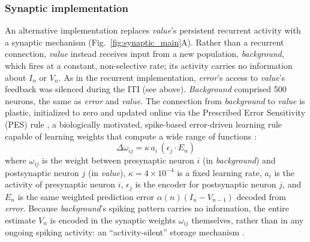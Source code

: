 \documentclass[12pt]{article}
\begin{document}
\subsubsection*{Synaptic implementation}
An alternative implementation replaces \textit{value}'s persistent recurrent activity with a synaptic mechanism (Fig.~\ref{fig:synaptic_main}A). Rather than a recurrent connection, \textit{value} instead receives input from a new population, \textit{background}, which fires at a constant, non-selective rate; its activity carries no information about $I_n$ or $V_n$. As in the recurrent implementation, \textit{error}'s access to \textit{value}'s feedback was silenced during the ITI (see above). \textit{Background} comprised 500 neurons, the same as \textit{error} and \textit{value}. The connection from \textit{background} to \textit{value} is plastic, initialized to zero and updated online via the Prescribed Error Sensitivity (PES) rule \cite{macneil2011fine}, a biologically motivated, spike-based error-driven learning rule capable of learning weights that compute a wide range of functions \cite{voelker2015solution}:
\begin{equation}
    \label{eq:pes}
    \Delta\omega_{ij} = \kappa\, a_i\, (\epsilon_j \cdot E_n)
\end{equation}
where $\omega_{ij}$ is the weight between presynaptic neuron $i$ (in \textit{background}) and postsynaptic neuron $j$ (in \textit{value}), $\kappa=4\times10^{-4}$ is a fixed learning rate, $a_i$ is the activity of presynaptic neuron $i$, $\epsilon_j$ is the encoder for postsynaptic neuron $j$, and $E_n$ is the same weighted prediction error $\alpha(n)(I_n-V_{n-1})$ decoded from \textit{error}. Because \textit{background}'s spiking pattern carries no information, the entire estimate $V_n$ is encoded in the synaptic weights $\omega_{ij}$ themselves, rather than in any ongoing spiking activity: an ``activity-silent'' storage mechanism \cite{mongillo2008synaptic, stokes2015activity}.
\end{document}
